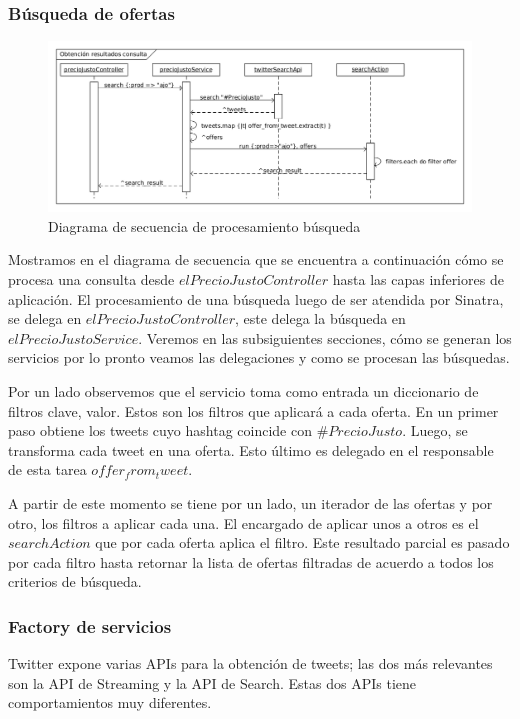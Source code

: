 \subsubsection{B\'usqueda de ofertas}
\begin{figure}[h]
\centerline{\includegraphics[width=0.6\paperwidth]{./imgs/sequence_searchAction.png}}
\caption{Diagrama de secuencia de procesamiento b\'usqueda}
\label{fig:sequence_sinatra}
\end{figure}

Mostramos en el diagrama de secuencia que se encuentra a continuaci\'on c\'omo se procesa una consulta desde $elPrecioJustoController$ hasta las capas inferiores de aplicaci\'on.
El procesamiento de una b\'usqueda luego de ser atendida por Sinatra, se delega en $elPrecioJustoController$, este delega la b\'usqueda en $elPrecioJustoService$. Veremos en las subsiguientes secciones, c\'omo  se generan los servicios por lo pronto veamos las delegaciones y como se procesan las b\'usquedas.

Por un lado observemos que el servicio toma como entrada un diccionario de filtros clave, valor. Estos son los filtros que aplicar\'a a cada oferta.
En un primer paso obtiene los tweets cuyo hashtag coincide con $\#PrecioJusto$. Luego, se transforma cada tweet en una oferta. Esto \'ultimo es delegado en el responsable de esta tarea $offer_from_tweet$.

A partir de este momento se tiene por un lado, un iterador de las ofertas y por otro, los filtros a aplicar cada una. El encargado de aplicar unos a otros es el $searchAction$ que por cada oferta aplica el filtro. Este resultado parcial es pasado por cada filtro hasta retornar la lista de ofertas filtradas de acuerdo a todos los criterios de b\'usqueda.




\subsubsection{Factory de servicios}
Twitter expone varias APIs para la obtenci\'on de tweets; las dos m\'as relevantes son la API de Streaming y la API de Search. Estas dos APIs tiene comportamientos muy diferentes.

